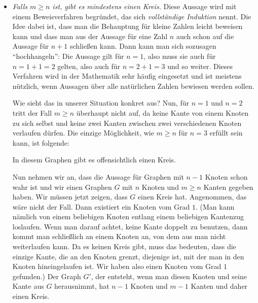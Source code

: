 \documentclass{zusammenfassung}
\begin{document}
\begin{itemize}
	\item \emph{Falls $m\geq n$ ist, gibt es mindestens einen Kreis.} Diese Aussage wird mit einem Beweisverfahren begründet, das
		sich \emph{vollständige Induktion} nennt. Die Idee dabei ist, dass man die Behauptung für kleine Zahlen leicht beweisen kann
		und dass man aus der Aussage für eine Zahl $n$ auch schon auf die Aussage für $n+1$ schließen kann. Dann kann man sich
		sozusagen "`hochhangeln"': Die Aussage gilt für $n=1$, also muss sie auch für $n=1+1=2$ gelten, also auch für $n=2+1=3$ und so
		weiter. Dieses Verfahren wird in der Mathematik sehr häufig eingesetzt und ist meistens nützlich, wenn Aussagen über alle
		natürlichen Zahlen bewiesen werden sollen.

		Wie sieht das in unserer Situation konkret aus? Nun, für $n=1$ und $n=2$ tritt der Fall $m\geq n$ überhaupt nicht auf, da
		keine Kante von einem Knoten zu sich selbst und keine zwei Kanten zwischen zwei verschiedenen Knoten verlaufen dürfen. Die
		einzige Möglichkeit, wie $m\geq n$ für $n=3$ erfüllt sein kann, ist folgende:
		\enlargethispage{2.8cm}
		\begin{center}
		\end{center}
		In diesem Graphen gibt es offensichtlich einen Kreis.
		\pagebreak

		Nun nehmen wir an, dass die Aussage für Graphen mit $n-1$ Knoten schon wahr ist und wir einen Graphen $G$ mit $n$ Knoten und 
		$m\geq n$ Kanten gegeben haben. Wir müssen jetzt zeigen, dass $G$ einen Kreis hat. Angenommen, das wäre nicht der Fall. Dann
		existiert ein Knoten vom Grad $1$. (Man kann nämlich von einem beliebigen Knoten entlang einem beliebigen Kantenzug loslaufen.
		Wenn man darauf achtet, keine Kante doppelt zu benutzen, dann kommt man schließlich an einem Knoten an, von dem aus man nicht
		weiterlaufen kann. Da es keinen Kreis gibt, muss das bedeuten, dass die einzige Kante, die an den Knoten grenzt, diejenige
		ist, mit der man in den Knoten hineingelaufen ist. Wir haben also einen Knoten vom Grad $1$ gefunden.) Der Graph $G'$, der
		entsteht, wenn man diesen Knoten und seine Kante aus $G$ herausnimmt, hat $n-1$ Knoten und $m-1$ Kanten und daher einen Kreis.


\end{itemize}
\end{document}
